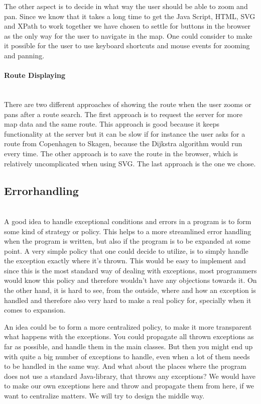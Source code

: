 \documentclass[a4paper,10pt,titlepage]{article}
\begin{document}
The other aspect is to decide in what way the user should be able to zoom and pan. Since we know that it takes a long time to get the Java Script, HTML, SVG and XPath to work together we have chosen to settle for buttons in the browser as the only way for the user to navigate in the map. One could consider to make it possible for the user to use keyboard shortcuts and mouse events for zooming and panning. 

\paragraph{Route Displaying}\mbox{}\\
There are two different approaches of showing the route when the user zooms or pans after a route search. The first approach is to request the server for more map data and the same route. This approach is good because it keeps functionality at the server but it can be slow if for instance the user asks for a route from Copenhagen to Skagen, because the Dijkstra algorithm would run every time. The other approach is to save the route in the browser, which is relatively uncomplicated when using SVG. The last approach is the one we chose.	

\subsection{Errorhandling}\mbox{}\\
A good idea to handle exceptional conditions and errors in a program is to form some kind of strategy or policy. This helps to a more streamlined error handling when the program is written, but also if the program is to be expanded at some point. A very simple policy that one could decide to utilize, is to simply handle the exception exactly where it's thrown. This would be easy to implement and since this is the most standard way of dealing with exceptions, most programmers would know this policy and therefore wouldn't have any objections towards it. On the other hand, it is hard to see, from the outside, where and how an exception is handled and therefore also very hard to make a real policy for, specially when it comes to expansion.

An idea could be to form a more centralized policy, to make it more transparent what happens with the exceptions. You could propagate all thrown exceptions as far as possible, and handle them in the main classes. But then you might end up with quite a big number of exceptions to handle, even when a lot of them needs to be handled in the same way. And what about the places where the program does not use a standard Java-library, that throws any exceptions? We would have to make our own exceptions here and throw and propagate them from here, if we want to centralize matters. We will try to design the middle way.
\end{document}
